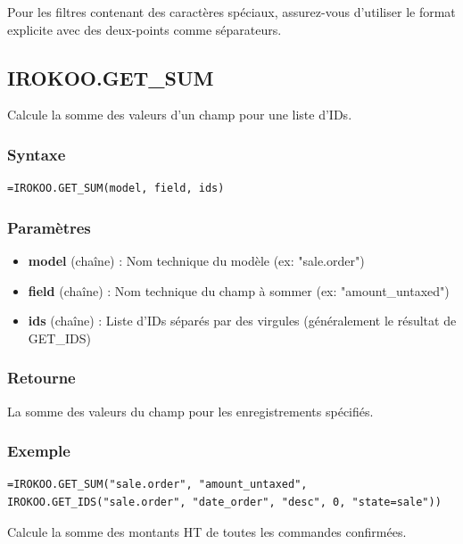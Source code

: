\documentclass[12pt, a4paper]{article}
\begin{document}
\begin{warning}
Pour les filtres contenant des caractères spéciaux, assurez-vous d'utiliser le format explicite avec des deux-points comme séparateurs.
\end{warning}

\subsection{IROKOO.GET\_SUM}
\begin{tcolorbox}[title=Description]
Calcule la somme des valeurs d'un champ pour une liste d'IDs.
\end{tcolorbox}

\subsubsection{Syntaxe}
\begin{lstlisting}
=IROKOO.GET_SUM(model, field, ids)
\end{lstlisting}

\subsubsection{Paramètres}
\begin{itemize}
    \item \textbf{model} (chaîne) : Nom technique du modèle (ex: "sale.order")
    \item \textbf{field} (chaîne) : Nom technique du champ à sommer (ex: "amount\_untaxed")
    \item \textbf{ids} (chaîne) : Liste d'IDs séparés par des virgules (généralement le résultat de GET\_IDS)
\end{itemize}

\subsubsection{Retourne}
La somme des valeurs du champ pour les enregistrements spécifiés.

\subsubsection{Exemple}
\begin{lstlisting}
=IROKOO.GET_SUM("sale.order", "amount_untaxed", IROKOO.GET_IDS("sale.order", "date_order", "desc", 0, "state=sale"))
\end{lstlisting}
Calcule la somme des montants HT de toutes les commandes confirmées.
\end{document}
